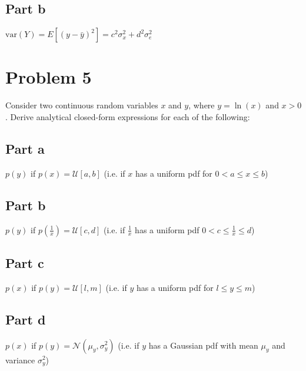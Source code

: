 \documentclass[11pt]{article}
\begin{document}
\subsection*{Part b}
$\text{var}(Y) = E[(y-\bar{y})^2]=c^2\sigma_x^2+d^2\sigma_e^2$

\section*{Problem 5}
Consider two continuous random variables $x$ and $y$, where $y=\ln(x)$ and $x>0$. Derive analytical closed-form expressions for each of the following:

\subsection*{Part a}
$p(y)$ if $p(x) = \mathcal{U}[a,b]$ (i.e. if $x$ has a uniform pdf for $0<a\leq x \leq b$)

\subsection*{Part b}
$p(y)$ if $p(\frac{1}{x})=\mathcal{U}[c,d]$ (i.e. if $\frac{1}{x}$ has a uniform pdf $0<c\leq \frac{1}{x} \leq d$)

\subsection*{Part c}
$p(x)$ if $p(y) = \mathcal{U}[l,m]$ (i.e. if $y$ has a uniform pdf for $l\leq y \leq m$)

\subsection*{Part d}
$p(x)$ if $p(y) = \mathcal{N}(\mu_y,\sigma_y^2)$ (i.e. if $y$ has a Gaussian pdf with mean $\mu_y$ and variance $\sigma_y^2$)
\end{document}
